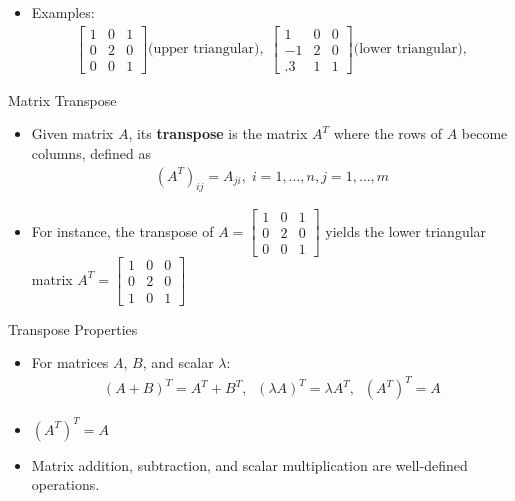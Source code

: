 \begin{frame}{}
\begin{itemize}
   \item Examples: 
    \begin{align*}
        \begin{bmatrix}
            1 & 0 & 1\\
            0 & 2 & 0 \\
            0 & 0 & 1
        \end{bmatrix} \text{(upper triangular)}, \;  \begin{bmatrix}
            1 & 0 & 0\\
            -1 & 2 & 0 \\
            .3 & 1 & 1
        \end{bmatrix} \text{(lower triangular)}, 
    \end{align*}
\end{itemize}
    
\end{frame}
\begin{frame}{Matrix Transpose}
\begin{itemize}
    \item Given matrix $A$, its \textbf{transpose} is the matrix $A^T$ where the rows of $A$ become columns, defined as 
    \begin{align*}
        (A^T)_{ij} = A_{ji}, \; i=1, \ldots, n, j= 1, \ldots, m
    \end{align*}
    \item  For instance, the transpose of $A=\begin{bmatrix}
            1 & 0 & 1\\
            0 & 2 & 0 \\
            0 & 0 & 1
        \end{bmatrix}$ yields the lower triangular matrix  $A^T = \begin{bmatrix}
            1 & 0 & 0\\
            0 & 2 & 0 \\
            1 & 0 & 1
        \end{bmatrix}$
\end{itemize}
\end{frame}
\begin{frame}{Transpose Properties}
\begin{itemize}
    \item For matrices $A$, $B$, and scalar $\lambda$:
    \begin{align}
        (A + B)^T = A^T + B^T, \;\; (\lambda A)^T = \lambda A^T,\;\;  (A^T)^T = A
    \end{align}
    
    \item $(A^T)^T = A$
    \item Matrix addition, subtraction, and scalar multiplication are well-defined operations.
 \end{itemize}
\end{frame}
